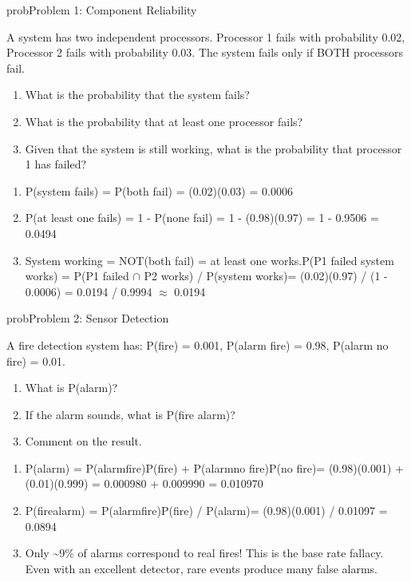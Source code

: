 \begin{PSbox}[unbreakable]{prob}{Problem 1: Component Reliability}

A system has two independent processors. Processor 1 fails with probability 0.02, Processor 2 fails with probability 0.03. The system fails only if BOTH processors fail.

\begin{enumerate}
\def\labelenumi{(\alph{enumi})}
\tightlist
\item
  What is the probability that the system fails?
\item
  What is the probability that at least one processor fails?
\item
  Given that the system is still working, what is the probability that processor 1 has failed?
\end{enumerate}

\PSsolution{} 

\begin{enumerate}
\def\labelenumi{(\alph{enumi})}
\item
  P(system fails) = P(both fail) = (0.02)(0.03) = 0.0006
\item
  P(at least one fails) = 1 - P(none fail) = 1 - (0.98)(0.97) = 1 - 0.9506 = 0.0494
\item
  System working = NOT(both fail) = at least one works.\PSbr{}P(P1 failed \textbar{} system works) = P(P1 failed \ensuremath{\cap} P2 works) / P(system works)\PSbr{}= (0.02)(0.97) / (1 - 0.0006) = 0.0194 / 0.9994 \ensuremath{\approx} 0.0194
\end{enumerate}

\end{PSbox}

\begin{PSbox}[unbreakable]{prob}{Problem 2: Sensor Detection}

A fire detection system has: P(fire) = 0.001, P(alarm \textbar{} fire) = 0.98, P(alarm \textbar{} no fire) = 0.01.

\begin{enumerate}
\def\labelenumi{(\alph{enumi})}
\tightlist
\item
  What is P(alarm)?
\item
  If the alarm sounds, what is P(fire \textbar{} alarm)?
\item
  Comment on the result.
\end{enumerate}

\PSsolution{} 

\begin{enumerate}
\def\labelenumi{(\alph{enumi})}
\item
  P(alarm) = P(alarm\textbar{}fire)P(fire) + P(alarm\textbar{}no fire)P(no fire)\PSbr{}= (0.98)(0.001) + (0.01)(0.999) = 0.000980 + 0.009990 = 0.010970
\item
  P(fire\textbar{}alarm) = P(alarm\textbar{}fire)P(fire) / P(alarm)\PSbr{}= (0.98)(0.001) / 0.01097 = 0.0894
\item
  Only \textasciitilde{}9\% of alarms correspond to real fires! This is the base rate fallacy. Even with an excellent detector, rare events produce many false alarms.
\end{enumerate}

\end{PSbox}

